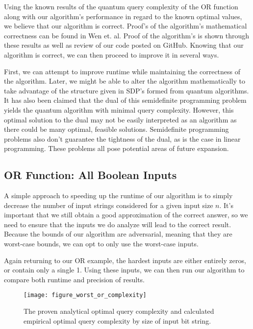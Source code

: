Using the known results of the quantum query
complexity of the OR function along with our
algorithm's performance in regard to the known
optimal values, we believe that our algorithm is
correct. Proof's of the algorithm's mathematical
correctness can be found in Wen et. al. Proof of the
algorithm's is shown through these results as well as
review of our code posted on GitHub. Knowing that our
algorithm is correct, we can then proceed to improve
it in several ways. 

First, we can attempt to improve runtime while
maintaining the correctness of the algorithm. Later,
we might be able to alter the algorithm
mathematically to take advantage of the structure
given in SDP's formed from quantum algorithms. 
It has also been claimed that the dual of this semidefinite
programming problem yields the quantum algorithm with minimal query complexity.
However, this optimal solution to the dual may not be easily 
interpreted as an algorithm as there could be many optimal, feasible solutions. 
Semidefinite programming problems also don't guarantee the tightness of the dual,
as is the case in linear programming. 
These problems all pose potential areas of future expansion.

\subsection{OR Function: All Boolean Inputs}

A simple approach to speeding up the runtime of our
algorithm is to simply decrease the number of input
strings considered for a given input size $n$. It's
important that we still obtain a good approximation
of the correct answer, so we need to ensure that the
inputs we do analyze will lead to the correct result.
Because the bounds of our algorithm are adversarial,
meaning that they are worst-case bounds, we can opt
to only use the worst-case inputs.

Again returning to our OR example, the hardest inputs are
either entirely zeros, or contain only a single 1. 
Using these inputs, we can then run our algorithm to 
compare both runtime and precision of results.

\begin{figure}[ht]
\centering
\texttt{[image: figure\_worst\_or\_complexity]}
\caption{The proven analytical optimal query complexity
and calculated empirical optimal query complexity by 
size of input bit string.}
\label{fig:or_worst_complexity}
\end{figure}

